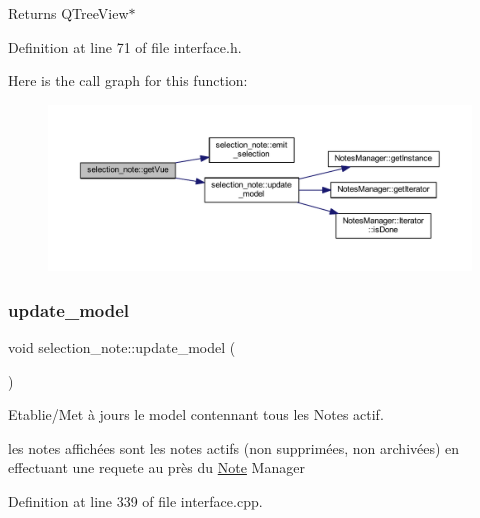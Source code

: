 \begin{DoxyReturn}{Returns}
Q\+Tree\+View$\ast$ 
\end{DoxyReturn}


Definition at line 71 of file interface.\+h.

Here is the call graph for this function\+:\nopagebreak
\begin{figure}[H]
\begin{center}
\leavevmode
\includegraphics[width=350pt]{classselection__note_a8ebca9b8b266b7891b807a5f1af3cf2b_cgraph}
\end{center}
\end{figure}
\mbox{\label{classselection__note_aab004424eba4264628d2e01108f2e63b}} 
\subsubsection{\texorpdfstring{update\+\_\+model}{update\_model}}
{\footnotesize\ttfamily void selection\+\_\+note\+::update\+\_\+model (\begin{DoxyParamCaption}{ }\end{DoxyParamCaption})\hspace{0.3cm}{\ttfamily [slot]}}



Etablie/\+Met à jours le model contennant tous les Notes actif. 

les notes affichées sont les notes actifs (non supprimées, non archivées) en effectuant une requete au près du \hyperlink{class_note}{Note} Manager 

Definition at line 339 of file interface.\+cpp.

